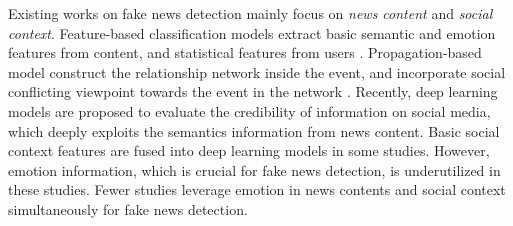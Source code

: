 \documentclass{article}
\begin{document}
	Existing works on fake news detection mainly focus on {\em news content} and {\em social context}. Feature-based classification models extract basic semantic and emotion features from content, and statistical features from users \cite{castillo2011information}. Propagation-based model construct the relationship network inside the event, and incorporate social conflicting viewpoint towards the event in the network \cite{jin2014news,jin2016news}. Recently, deep learning models are proposed to evaluate the credibility of information on social media, which deeply exploits the semantics information from news content\cite{ma2016detecting}. Basic social context features are fused into deep learning models in some studies\cite{guo2018rumor}. However, emotion information, which is crucial for fake news detection, is underutilized in these studies. Fewer studies leverage emotion in news contents and social context simultaneously for fake news detection.
	
	
\end{document}
